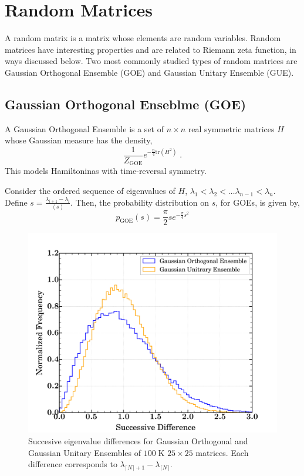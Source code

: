 \documentclass{amsproc}
\theoremstyle{definition}
\theoremstyle{remark}
\numberwithin{equation}{section}
\begin{document}
\section{Random Matrices}
A random matrix is a matrix whose elements are random variables. Random matrices have interesting properties and are related to Riemann zeta function, in ways discussed below. Two most commonly studied types of random matrices are Gaussian Orthogonal Ensemble (GOE) and Gaussian Unitary Ensemble (GUE). 

\subsection{Gaussian Orthogonal Enseblme (GOE)}
A Gaussian Orthogonal Ensemble is a set of $n \times n$ real symmetric matrices $H$ whose Gaussian measure has the density, 
$$
\frac{1}{Z_{\mathrm{GOE}}} e^{ - \frac{n}{4} \mathrm{tr}(H^2) } \;.
$$
This models Hamiltoninas with time-reversal symmetry. 

Consider the ordered sequence of eigenvalues of $H$, $\lambda_1 < \lambda_2 < \ldots \lambda_{n - 1} < \lambda_n$. Define $s = \frac{\lambda_{i + 1} - \lambda_{i}}{ \left< s \right> }$. Then, the probability distribution on $s$, for GOEs, is given by, 
$$
p_{\mathrm{GOE}}(s) = \frac{\pi}{2} s e^{- \frac{\pi}{4} s^2 }
$$

\begin{figure}
\includegraphics[width=\columnwidth]{figures/random_matrices_eigenvalues_differences.pdf}
\caption{Succesive eigenvalue differences for Gaussian Orthogonal and Gaussian Unitary Ensembles of $100\;\mathrm{K}$ $25 \times 25$ matrices. Each difference corresponds to $\lambda_{\lceil N \rceil + 1} - \lambda_{ \lceil N \rceil}$.}
\label{fig:random_matrices_eigenvalues_differences}
\end{figure}
\end{document}
